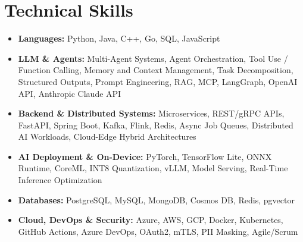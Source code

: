\documentclass[letterpaper,10.5pt]{article}
\newcommand{\sqbullet}{\raisebox{0.15ex}{\scriptsize$\blacksquare$}}
\newcommand{\resumeSubHeadingListStart}{\begin{itemize}[leftmargin=0.15in, label=\sqbullet]}
\newcommand{\resumeSubHeadingListEnd}{\end{itemize}}
\begin{document}
\section{Technical Skills}
  \resumeSubHeadingListStart
    \item\small{\textbf{Languages:} Python, Java, C++, Go, SQL, JavaScript}
    \item\small{\textbf{LLM \& Agents:} Multi-Agent Systems, Agent Orchestration, Tool Use / Function Calling, Memory and Context Management, Task Decomposition, Structured Outputs, Prompt Engineering, RAG, MCP, LangGraph, OpenAI API, Anthropic Claude API}
    \item\small{\textbf{Backend \& Distributed Systems:} Microservices, REST/gRPC APIs, FastAPI, Spring Boot, Kafka, Flink, Redis, Async Job Queues, Distributed AI Workloads, Cloud-Edge Hybrid Architectures}
    \item\small{\textbf{AI Deployment \& On-Device:} PyTorch, TensorFlow Lite, ONNX Runtime, CoreML, INT8 Quantization, vLLM, Model Serving, Real-Time Inference Optimization}
    \item\small{\textbf{Databases:} PostgreSQL, MySQL, MongoDB, Cosmos DB, Redis, pgvector}
    \item\small{\textbf{Cloud, DevOps \& Security:} Azure, AWS, GCP, Docker, Kubernetes, GitHub Actions, Azure DevOps, OAuth2, mTLS, PII Masking, Agile/Scrum}
  \resumeSubHeadingListEnd
\end{document}

